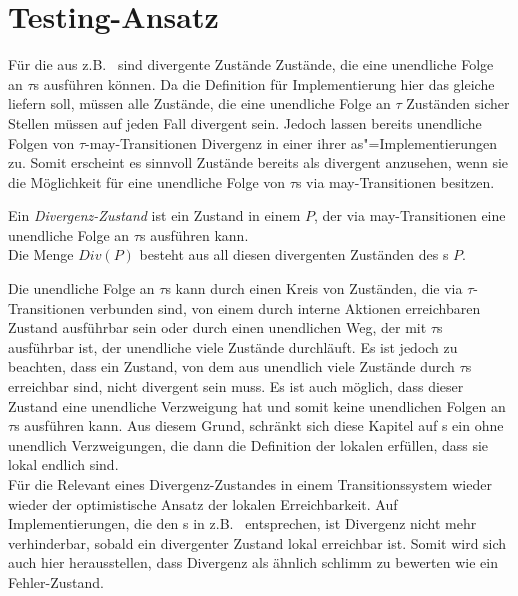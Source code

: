 \section{Testing-Ansatz}

Für die \EIO{} aus z.B.~\cite{Schinko2016BA} sind divergente Zustände Zustände,
die eine unendliche Folge an $\tau$s ausführen können. Da die Definition für
Implementierung hier das gleiche liefern soll, müssen alle Zustände, die eine
unendliche Folge an $\tau$ Zuständen sicher Stellen müssen auf jeden Fall
divergent sein. Jedoch lassen bereits unendliche Folgen von
$\tau$-may-Transitionen Divergenz in einer ihrer as"=Implementierungen zu.
Somit erscheint es sinnvoll Zustände bereits als divergent anzusehen, wenn sie
die Möglichkeit für eine unendliche Folge von $\tau$s via may-Transitionen
besitzen.

\begin{Def}[Divergenz]
  Ein \emph{Divergenz-Zustand} ist ein Zustand in einem \MEIO{} $P$, der via
  may-Transitionen eine unendliche Folge an $\tau$s ausführen kann.\\
  Die Menge $Div(P)$ besteht aus all diesen divergenten Zuständen des \MEIO{}s
  $P$.
\end{Def}

Die unendliche Folge an $\tau$s kann durch einen Kreis von Zuständen, die via
$\tau$-Transitionen verbunden sind, von einem durch interne Aktionen
erreichbaren Zustand ausführbar sein oder durch einen unendlichen Weg, der mit
$\tau$s ausführbar ist, der unendliche viele Zustände durchläuft. Es ist jedoch
zu beachten, dass ein Zustand, von dem aus unendlich viele Zustände durch
$\tau$s  erreichbar sind, nicht divergent sein muss. Es ist auch möglich,
dass dieser Zustand eine unendliche Verzweigung hat und somit keine unendlichen
Folgen an $\tau$s ausführen kann. Aus diesem Grund, schränkt sich diese Kapitel
auf \MEIO{}s ein ohne unendlich Verzweigungen, die dann die Definition der
lokalen erfüllen, dass sie lokal endlich sind.\\
Für die Relevant eines Divergenz-Zustandes in einem Transitionssystem wieder
wieder der optimistische Ansatz der lokalen Erreichbarkeit. Auf
Implementierungen, die den \EIO{}s in z.B.~\cite{Schinko2016BA} entsprechen,
ist Divergenz nicht mehr verhinderbar, sobald ein divergenter Zustand lokal
erreichbar ist. Somit wird sich auch hier herausstellen, dass Divergenz als
ähnlich \glqq schlimm\grqq{} zu bewerten wie ein Fehler-Zustand.

